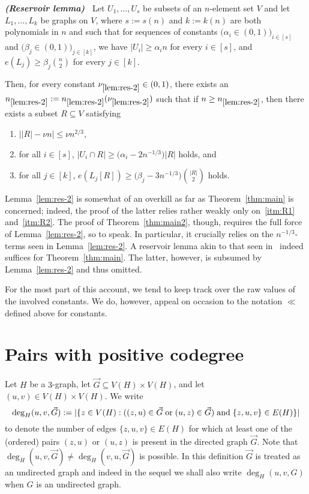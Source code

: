 \documentclass[11pt,reqno]{amsart}
\def\resrefone{\mathrm{\ref{lem:res-2}}}
\begin{document}
\begin{lemma}\label{lem:res-2}{\em\bf(Reservoir lemma)~\cite[Lemma~3.10]{Mathias3}}
Let $U_1,\ldots,U_s$ be subsets of an $n$-element set $V$ and let $L_1,\ldots,L_k$ be graphs on $V$, where $s :=s(n)$ and $k:=k(n)$ are both polynomials in $n$ and such that for sequences of constants $\big(\alpha_i \in (0,1)\big)_{i \in [s]}$ and $\big(\beta_j \in (0,1)\big)_{j \in [k]}$, we have $|U_i| \geq \alpha_i n$ for every $i \in [s]$, and $e(L_j) \geq \beta_j\binom{n}{2}$ for every $j \in [k]$. 

Then, for every constant $\nu_{\resrefone} \in (0,1)$, there exists an $n_{\resrefone} := n_{\resrefone}(\nu_{\resrefone})$ such that if $n \geq n_{\resrefone}$, then there exists a subset $R \subseteq V$ satisfying
\begin{enumerate}
	\item [\namedlabel{itm:R1}{(R.1)}] $\big| |R| - \nu n\big| \leq \nu n^{2/3}$,
	\item [\namedlabel{itm:R2}{(R.2)}] for all $i \in [s]$, $|U_i \cap R| \geq 
	\big(\alpha_i - 2n^{-1/3} \big)|R|$ holds, and
	\item [\namedlabel{itm:R3}{(R.3)}] for all $j \in [k]$, $e(L_j[R]) \geq 
	\big(\beta_j - 3n^{-1/3} \big)\binom{|R|}{2}$ holds. 
\end{enumerate}
\end{lemma}

Lemma~\ref{lem:res-2} is somewhat of an overkill as far as Theorem~\ref{thm:main} is concerned; indeed, the proof of the latter relies rather weakly only on~\ref{itm:R1} and~\ref{itm:R2}. The proof of Theorem~\ref{thm:main2}, though, requires the full force of Lemma~\ref{lem:res-2}, so to speak. In particular, it crucially relies on the $n^{-1/3}$-terms seen in Lemma~\ref{lem:res-2}. A reservoir lemma akin to that seen in~\cite{RRS06} indeed suffices for Theorem~\ref{thm:main}. The latter, however, is subsumed by Lemma~\ref{lem:res-2} and thus omitted. 

\vspace{1ex}
\noindent
{} For the most part of this account, we tend to keep track over the raw values of the involved constants. We do, however, appeal on occasion to the notation $\ll$ defined above for constants.

\section{Pairs with positive codegree}\label{sec:positive} 
Let $H$ be a $3$-graph, let $\vec G \subseteq V(H) \times V(H)$, and let 
$(u,v) \in V(H) \times V(H)$. We write 
$$
\deg_H(u,v,\vec G):= |\{z \in V(H): ((z,u) \in \vec G \; \text{or}\; (u,z) \in \vec G)  \; \text{and}\; \{z,u,v\} \in E(H)\}|
$$ 
to denote the number of edges $\{z,u,v\} \in E(H)$ for which at least one of the (ordered) pairs $(z,u)$ or $(u,z)$ is present in  the directed graph $\vec G$. 
Note that $\deg_H(u,v,\vec G) \not= \deg_H(v,u,\vec G)$ is possible. In this definition $\vec G$ is treated as an undirected graph and indeed in the sequel we shall also write $\deg_H(u,v,G)$ when $G$ is an undirected graph. 
\end{document}
